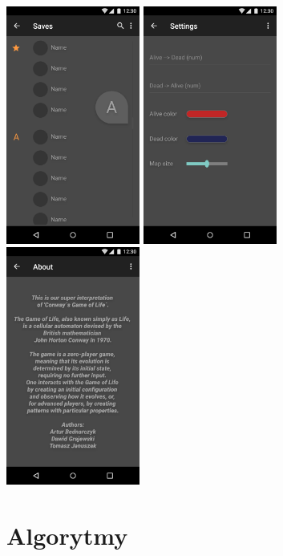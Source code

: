 \documentclass[12pt,a4paper]{article}
\begin{document}
\includegraphics[width=0.33\textwidth]{Images/ui_saves.png}
\includegraphics[width=0.33\textwidth]{Images/ui_settings.png}
\includegraphics[width=0.33\textwidth]{Images/ui_about.png}
\section{Algorytmy}
\end{document}

